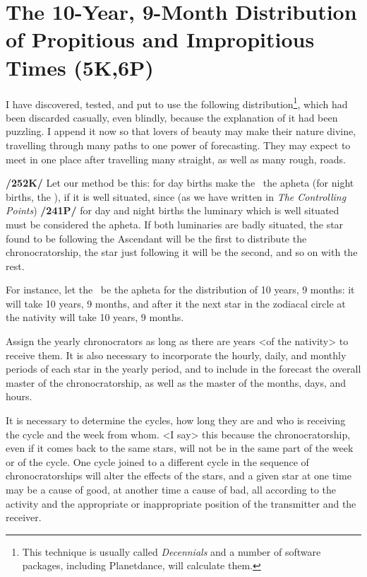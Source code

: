 \section{The 10-Year, 9-Month Distribution of Propitious and Impropitious Times (5K,6P)}

I have discovered, tested, and put to use the following distribution\footnote{This technique is usually called \textsl{Decennials} and a number of software packages, including Planetdance, will calculate them.}, which had been discarded casually, even blindly, because the explanation of it had been puzzling. I append it now so that lovers of beauty may make their nature divine, travelling through many paths to one power of forecasting. They may expect to meet in one place after travelling many straight, as well as many rough, roads.

\textbf{/252K/} Let our method be this: for day births make the \Sun\, the apheta (for night births, the \Moon), if it is well situated, since (as we have written in \textit{The Controlling Points}) \textbf{/241P/} for day and night births the luminary which is well situated must be considered the apheta. If both luminaries are badly situated, the star found to be following the Ascendant will be the first to distribute the chronocratorship, the star just following it will be the second, and so on with the rest.

For instance, let the \Sun\, be the apheta for the distribution of 10 years, 9 months: it will take 10 years, 9 months, and after it the next star in the zodiacal circle at the nativity will take 10 years, 9 months.

Assign the yearly chronocrators as long as there are years <of the nativity> to receive them. It is also necessary to incorporate the hourly, daily, and monthly periods of each star in the yearly period, and to include in the forecast the overall master of the chronocratorship, as well as the master of the months, days, and hours. 

It is necessary to determine the cycles, how long they are and who is receiving the cycle and the week from whom. <I say> this because the chronocratorship, even if it comes back to the same stars,
will not be in the same part of the week or of the cycle. One cycle joined to a different cycle in the sequence of chronocratorships will alter the effects of the stars, and a given star at one time may be a cause of good, at another time a cause of bad, all according to the activity and the appropriate or inappropriate position of the transmitter and the receiver.

